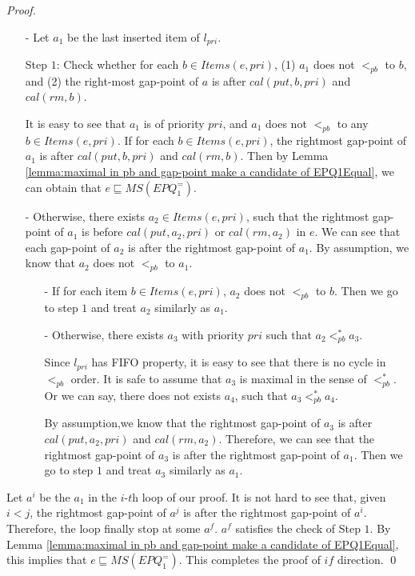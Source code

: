 \begin {proof}
\begin{itemize}
\item[-] Let $a_1$ be the last inserted item of $l_{\textit{pri}}$.

    Step $1$: Check whether for each $b \in \textit{Items}(e,\textit{pri})$, (1) $a_1$ does not $<_{\textit{pb}}$ to $b$, and (2) the right-most gap-point of $a$ is after $\textit{cal}(\textit{put},b,\textit{pri})$ and $\textit{cal}(\textit{rm},b)$.

    It is easy to see that $a_1$ is of priority $\textit{pri}$, and $a_1$ does not $<_{\textit{pb}}$ to any $b \in \textit{Items}(e,\textit{pri})$. If for each $b \in \textit{Items}(e,\textit{pri})$, the rightmost gap-point of $a_1$ is after $\textit{cal}(\textit{put},b,\textit{pri})$ and $\textit{cal}(\textit{rm},b)$. Then by Lemma \ref{lemma:maximal in pb and gap-point make a candidate of EPQ1Equal}, we can obtain that $e \sqsubseteq \textit{MS}(\textit{EPQ}_1^{=})$.


\item[-] Otherwise, there exists $a_2 \in \textit{Items}(e,\textit{pri})$, such that the rightmost gap-point of $a_1$ is before $\textit{cal}(\textit{put},a_2,\textit{pri})$ or $\textit{cal}(\textit{rm},a_2)$ in $e$. We can see that each gap-point of $a_2$ is after the rightmost gap-point of $a_1$.%
    By assumption, we know that $a_2$ does not $<_{\textit{pb}}$ to $a_1$.

    \begin{itemize}
    \setlength{\itemsep}{0.5pt}
    \item[-] If for each item $b \in \textit{Items}(e,\textit{pri})$, $a_2$ does not $<_{\textit{pb}}$ to $b$. Then we go to step $1$ and treat $a_2$ similarly as $a_1$.
    \item[-] Otherwise, there exists $a_3$ with priority $\textit{pri}$ such that $a_2 <_{\textit{pb}}^* a_3$.

    Since $l_{\textit{pri}}$ has FIFO property, it is easy to see that there is no cycle in $<_{\textit{pb}}$ order. It is safe to assume that $a_3$ is maximal in the sense of $<_{\textit{pb}}^*$. Or we can say, there does not exists $a_4$, such that $a_3 <_{\textit{pb}}^* a_4$.

    By assumption,we know that the rightmost gap-point of $a_3$ is after $\textit{cal}(\textit{put},a_2,\textit{pri})$ and $\textit{cal}(\textit{rm},a_2)$. Therefore, we can see that the rightmost gap-point of $a_3$ is after the rightmost gap-point of $a_1$. Then we go to step $1$ and treat $a_3$ similarly as $a_1$.
    \end{itemize}
\end{itemize}

Let $a^i$ be the $a_1$ in the $\textit{i-th}$ loop of our proof. It is not hard to see that, given $i<j$, the rightmost gap-point of $a^j$ is after the rightmost gap-point of $a^i$. Therefore, the loop finally stop at some $a^f$. $a^f$ satisfies the check of Step $1$. By Lemma \ref{lemma:maximal in pb and gap-point make a candidate of EPQ1Equal}, this implies that $e \sqsubseteq \textit{MS}(\textit{EPQ}_1^{=})$. This completes the proof of $\textit{if}$ direction. \qed
\end {proof}

